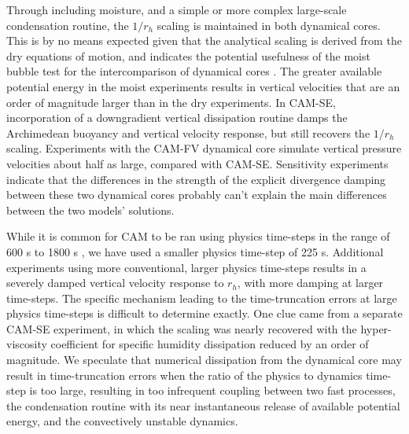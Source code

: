 Through including moisture, and a simple or more complex large-scale condensation routine, the $1/r_h$ scaling is maintained in both dynamical cores. This is by no means expected given that the analytical scaling is derived from the dry equations of motion, and indicates the potential usefulness of the moist bubble test for the intercomparison of dynamical cores \citep[e.g.,][]{RJ2012JAMES}. The greater available potential energy in the moist experiments results in vertical velocities that are an order of magnitude larger than in the dry experiments. In CAM-SE, incorporation of a downgradient vertical dissipation routine damps the Archimedean buoyancy and vertical velocity response, but still recovers the $1/r_h$ scaling. Experiments with the CAM-FV dynamical core simulate vertical pressure velocities about half as large, compared with CAM-SE. Sensitivity experiments indicate that the differences in the strength of the explicit divergence damping between these two dynamical cores probably can’t explain the main differences between the two models’ solutions.

While it is common for CAM to be ran using physics time-steps in the range of 600 s to 1800 s \citep{OETAL2013JCLIM,WETAL2014JAMES,RETAL2015JAS,ZetAl2014JCb,RM2016GRL}, we have used a smaller physics time-step of 225 s. Additional experiments using more conventional, larger physics time-steps results in a severely damped vertical velocity response to $r_h$, with more damping at larger time-steps. The specific mechanism leading to the time-truncation errors at large physics time-steps is difficult to determine exactly. One clue came from a separate CAM-SE experiment, in which the scaling was nearly recovered with the hyper-viscosity coefficient for specific humidity dissipation reduced by an order of magnitude. We speculate that numerical dissipation from the dynamical core may result in time-truncation errors when the ratio of the physics to dynamics time-step is too large, resulting in too infrequent coupling between two fast processes, the condensation routine with its near instantaneous release of available potential energy, and the convectively unstable dynamics.

